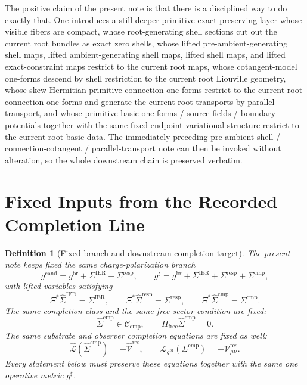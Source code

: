 \documentclass[11pt]{article}
\newcommand{\ObserverMap}{\Xi}
\newcommand{\ObserverMetric}{g^{\mathrm{br}}}
\newcommand{\CandidateMetric}{g^{\mathrm{cand}}}
\newcommand{\CompletedMetric}{g^{\sharp}}
\newcommand{\BaseShift}{\Sigma^{\mathrm{IER}}}
\newcommand{\ResponseShift}{\Sigma^{\mathrm{resp}}}
\newcommand{\CompShift}{\Sigma^{\mathrm{cmp}}}
\newcommand{\BaseLift}{\widehat\Sigma^{\mathrm{IER}}}
\newcommand{\ResponseLift}{\widehat\Sigma^{\mathrm{resp}}}
\newcommand{\CompLift}{\widehat\Sigma^{\mathrm{cmp}}}
\newcommand{\ResidualCore}{\mathcal V_{\mu\nu}^{\mathrm{res}}}
\newcommand{\ResidualLift}{\widehat{\mathcal V}^{\mathrm{res}}}
\newcommand{\SubReducedEin}{\widehat{\mathcal L}}
\newcommand{\FreeProj}{\Pi_{\mathrm{free}}}
\newcommand{\ReducedEin}{\mathcal L_{\ObserverMetric}}
\newcommand{\CompClass}{\mathscr C_{\mathrm{cmp}}}
\newtheorem{definition}{Definition}
\begin{document}
The positive claim of the present note is that there is a disciplined way to do exactly that. One introduces a still deeper primitive exact-preserving layer whose visible fibers are compact, whose root-generating shell sections cut out the current root bundles as exact zero shells, whose lifted pre-ambient-generating shell maps, lifted ambient-generating shell maps, lifted shell maps, and lifted exact-constraint maps restrict to the current root maps, whose cotangent-model one-forms descend by shell restriction to the current root Liouville geometry, whose skew-Hermitian primitive connection one-forms restrict to the current root connection one-forms and generate the current root transports by parallel transport, and whose primitive-basic one-forms / source fields / boundary potentials together with the same fixed-endpoint variational structure restrict to the current root-basic data. The immediately preceding pre-ambient-shell / connection-cotangent / parallel-transport note can then be invoked without alteration, so the whole downstream chain is preserved verbatim.

\section{Fixed Inputs from the Recorded Completion Line}

\begin{definition}[Fixed branch and downstream completion target]
\label{def:fixed_branch}
The present note keeps fixed the same charge-polarization branch
\begin{equation}
\CandidateMetric
=
\ObserverMetric+\BaseShift+\ResponseShift,
\qquad
\CompletedMetric
=
\ObserverMetric+\BaseShift+\ResponseShift+\CompShift,
\label{eq:fixed_metrics}
\end{equation}
with lifted variables satisfying
\begin{equation}
\ObserverMap^*\BaseLift=\BaseShift,
\qquad
\ObserverMap^*\ResponseLift=\ResponseShift,
\qquad
\ObserverMap^*\CompLift=\CompShift.
\label{eq:fixed_lifts}
\end{equation}
The same completion class and the same free-sector condition are fixed:
\begin{equation}
\CompLift\in\CompClass,
\qquad
\FreeProj\CompLift=0.
\label{eq:fixed_free}
\end{equation}
The same substrate and observer completion equations are fixed as well:
\begin{equation}
\SubReducedEin(\CompLift)=-\ResidualLift,
\qquad
\ReducedEin(\CompShift)=-\ResidualCore.
\label{eq:fixed_solves}
\end{equation}
Every statement below must preserve these equations together with the same one operative metric \(\CompletedMetric\).
\end{definition}
\end{document}
